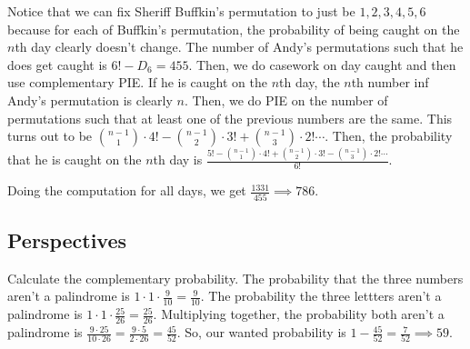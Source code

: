\documentclass[11pt]{article}
\begin{document}
\begin{sol} 
Notice that we can fix Sheriff Buffkin's permutation to just be $1,2,3,4,5,6$ because for each of Buffkin's permutation, the probability of being caught on the $n$th day clearly doesn't change. The number of Andy's permutations such that he does get caught is $6!-D_{6}=455$. Then, we do casework on day caught and then use complementary PIE. If he is caught on the $n$th day, the $n$th number inf Andy's permutation is clearly $n$. Then, we do PIE on the number of permutations  such that at least one of the previous numbers are the same. This turns out to be $\binom{n-1}{1}\cdot 4! - \binom{n-1}{2}\cdot 3! + \binom{n-1}{3}\cdot 2! \cdots$. Then, the probability that he is caught on the $n$th day is $\frac{5!-\binom{n-1}{1}\cdot 4! + \binom{n-1}{2}\cdot 3! - \binom{n-1}{3}\cdot 2! \cdots}{6!}$.


Doing the computation for all days, we get $\frac{1331}{455}\implies \boxed{786}$.
\end{sol}

\subsection{Perspectives}

\begin{sol}
Calculate the complementary probability. The probability that the three numbers aren't a palindrome is $1\cdot 1\cdot \frac{9}{10}=\frac{9}{10}$. The probability the three lettters aren't a palindrome is $1\cdot 1\cdot \frac{25}{26}=\frac{25}{26}$. Multiplying together, the probability both aren't a palindrome is $\frac{9\cdot 25}{10\cdot 26}=\frac{9\cdot 5}{2\cdot 26}=\frac{45}{52}$. So, our wanted probability is $1-\frac{45}{52}=\frac{7}{52}\implies \boxed{59}$.
\end{sol}

\end{document}
